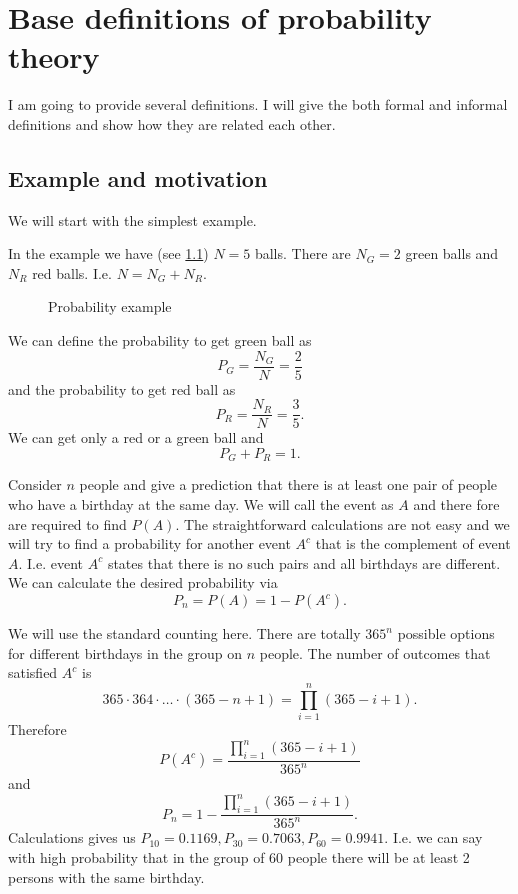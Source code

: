 \chapter{Base definitions of probability theory}
I am going to provide several definitions. I will give the both formal
and informal definitions and show how they are related each other.

\section{Example and motivation}
We will start with the simplest example. 
\begin{example}
\label{ex:initial}
In the example we have (see \cref{fig:simpleprobability}) $N=5$ balls.
There are $N_G = 2$ green balls and $N_R$ red balls. I.e. $N = N_G +
N_R$.  
\begin{figure}[H]
  \centering
  \caption{Probability example}
  \label{fig:simpleprobability}
\end{figure}

We can define the probability to get green ball as
\[
P_G = \frac{N_G}{N} = \frac{2}{5}
\]
and the probability to get red ball as
\[
P_R = \frac{N_R}{N} = \frac{3}{5}.
\]
We can get only a red or a green ball and 
\[
P_G + P_R = 1.
\]
\end{example}

\begin{example}
Consider $n$ people and give a prediction that there is at least one
pair of people who have a birthday at the same day. We will call the
event as $A$ and there fore are required to find $P(A)$. 
The straightforward calculations are not easy and we will try to find
a probability for another event $A^c$ that is the complement of event
$A$. I.e. event $A^c$ states that there is no such pairs and all
birthdays are different. We can calculate the desired probability via 
\[
P_n = P(A) = 1 - P(A^c).
\]

We will use the standard counting here. There are totally $365^n$
possible options for different birthdays in the group on $n$ people.
The number of outcomes that satisfied $A^c$ is 
\[
365 \cdot 364 \cdot \dots \cdot (365 -n +1) = 
\prod_{i = 1}^n (365 - i + 1).
\]
Therefore
\[
P(A^c) = \frac{\prod_{i = 1}^n (365 - i + 1)}{365^n}
\]
and
\[
P_n = 1 - \frac{\prod_{i = 1}^n (365 - i + 1)}{365^n}.
\]
Calculations gives us
$P_{10} = 0.1169, P_{30} = 0.7063, P_{60} = 0.9941$. I.e. we can say
with high probability
that in the group of 60 people there will be at least 2 persons with
the same birthday.
\end{example}

